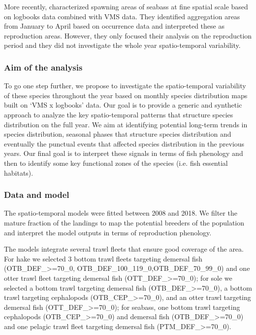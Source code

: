 More recently, \textcite{dambrine2021characterising} characterized spawning areas of seabass at fine spatial scale based on logbooks data combined with VMS data. They identified aggregation areas from January to April based on occurrence data and interpreted these as reproduction areas. However, they only focused their analysis on the reproduction period and they did not investigate the whole year spatio-temporal variability.

\subsubsection{Aim of the analysis}

To go one step further, we propose to investigate the spatio-temporal variability of these species throughout the year based on monthly species distribution maps built on `VMS x logbooks' data. Our goal is to provide a generic and synthetic approach to analyze the key spatio-temporal patterns that structure species distribution on the full year. We aim at identifying potential long-term trends in species distribution, seasonal phases that structure species distribution and eventually the punctual events that affected species distribution in the previous years. Our final goal is to interpret these signals in terms of fish phenology and then to identify some key functional zones of the species (i.e. fish essential habitats).

\subsubsection{Data and model}

The spatio-temporal models were fitted between 2008 and 2018. We filter the mature fraction of the landings to map the potential breeders of the population and interpret the model outputs in terms of reproduction phenology.

The models integrate several trawl fleets that ensure good coverage of the area. For hake we selected 3 bottom trawl fleets targeting demersal fish (OTB_DEF_>=70_0, OTB_DEF_100_119_0,OTB_DEF_70_99_0) and one otter trawl fleet targeting demersal fish (OTT_DEF_>=70_0); for sole we selected a bottom trawl targeting demersal fish (OTB_DEF_>=70_0), a bottom trawl targeting cephalopods (OTB_CEP_>=70_0), and an otter trawl targeting demersal fish (OTT_DEF_>=70_0); for seabass, one bottom trawl targeting cephalopods (OTB_CEP_>=70_0) and demersal fish (OTB_DEF_>=70_0) and one pelagic trawl fleet targeting demersal fish (PTM_DEF_>=70_0). 

